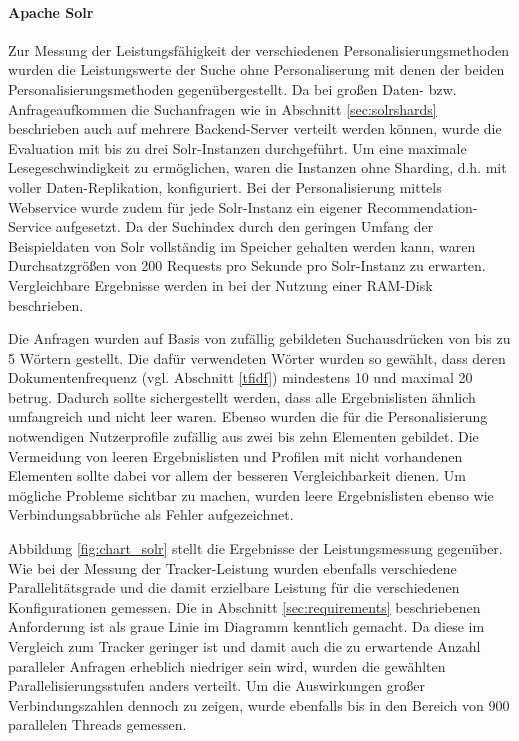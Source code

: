 \paragraph{Apache Solr} Zur Messung der Leistungsfähigkeit der verschiedenen Personalisierungsmethoden wurden die Leistungswerte der Suche ohne Personaliserung mit denen der beiden Personalisierungsmethoden gegenübergestellt. Da bei großen Daten- bzw. Anfrageaufkommen die Suchanfragen wie in Abschnitt  \ref{sec:solrshards} beschrieben auch auf mehrere Backend-Server verteilt werden können, wurde die Evaluation mit bis zu drei Solr-Instanzen durchgeführt. Um eine maximale Lesegeschwindigkeit zu ermöglichen, waren die Instanzen ohne Sharding, d.h. mit voller Daten-Replikation, konfiguriert. Bei der Personalisierung mittels Webservice wurde zudem für jede Solr-Instanz ein eigener Recommendation-Service aufgesetzt. Da der Suchindex durch den geringen Umfang der Beispieldaten von Solr vollständig im Speicher gehalten werden kann, waren Durchsatzgrößen von 200 Requests pro Sekunde pro Solr-Instanz zu erwarten. Vergleichbare Ergebnisse werden in \citep{Rappold2013} bei der Nutzung einer RAM-Disk beschrieben.

Die Anfragen wurden auf Basis von zufällig gebildeten Suchausdrücken von bis zu 5 Wörtern gestellt. Die dafür verwendeten Wörter wurden so gewählt, dass deren Dokumentenfrequenz (vgl. Abschnitt \ref{tfidf}) mindestens 10 und maximal 20 betrug. Dadurch sollte sichergestellt werden, dass alle Ergebnislisten ähnlich umfangreich und nicht leer waren. Ebenso wurden die für die Personalisierung notwendigen Nutzerprofile zufällig aus zwei bis zehn Elementen gebildet. Die Vermeidung von leeren Ergebnislisten und Profilen mit nicht vorhandenen Elementen sollte dabei vor allem der besseren Vergleichbarkeit dienen.  Um mögliche Probleme sichtbar zu machen, wurden leere Ergebnislisten ebenso wie Verbindungsabbrüche als Fehler aufgezeichnet.

Abbildung \ref{fig:chart_solr} stellt die Ergebnisse der Leistungsmessung gegenüber. Wie bei der Messung der Tracker-Leistung wurden ebenfalls verschiedene Parallelitätsgrade und die damit erzielbare Leistung für die verschiedenen Konfigurationen gemessen. Die in Abschnitt \ref{sec:requirements} beschriebenen Anforderung ist als graue Linie im Diagramm kenntlich gemacht. Da diese im Vergleich zum Tracker geringer ist und damit auch die zu erwartende Anzahl paralleler Anfragen erheblich niedriger sein wird, wurden die gewählten Parallelisierungsstufen anders verteilt. Um die Auswirkungen großer Verbindungszahlen dennoch zu zeigen, wurde ebenfalls bis in den Bereich von 900 parallelen Threads gemessen.

